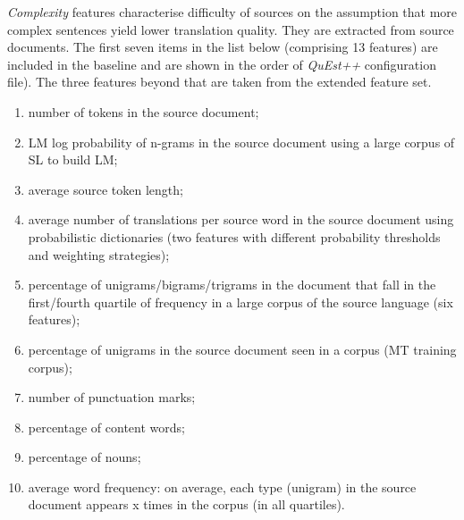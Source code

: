 \textit{Complexity} features characterise difficulty of sources on the assumption that more complex sentences yield lower translation quality. They are extracted from source documents. The first seven items in the list below (comprising 13 features) are included in the baseline and are shown in the order of \textit{QuEst++} configuration file). The three features beyond that are taken from the extended feature set.  
\begin{enumerate}\compresslist{}
	\item number of tokens in the source document;
	\item LM log probability of n-grams in the source document using a large corpus of SL to build LM;
	\item average source token length;
	\item average number of translations per source word in the source document using probabilistic dictionaries  (two features with different probability thresholds and weighting strategies);
	\item percentage of unigrams/bigrams/trigrams in the document that fall in the first/fourth quartile of frequency in a large corpus of the source language (six features);
	\item percentage of unigrams in the source document seen in a corpus (MT training corpus);
	\item number of punctuation marks;
	\item percentage of content words;
	\item percentage of nouns;
	\item average word frequency: on average, each type (unigram) in the source document appears x times in the corpus (in all quartiles).
\end{enumerate}

